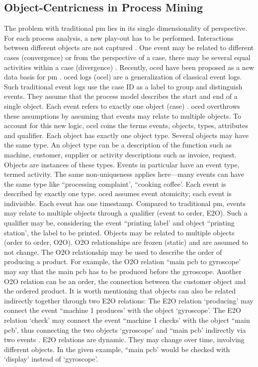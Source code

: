 \subsection{Object-Centricness in Process Mining}
\label{sec:object-centric-event-logs}

The problem with traditional \gls{pm} lies in its single dimensionality of perspective. For each process analysis, a new play-out has to be performed. Interactions between different objects are not captured \autocite{van2023object}. One event may be related to different cases (convergence) or from the perspective of a case, there may be several equal activities within a case (divergence) \autocite{van2019object}.
Recently, \gls{oced} have been proposed as a new data basis for \gls{pm} \autocite{van2019object}. \gls{oced} logs (\gls{ocel}) are a generalization of classical event logs. Such traditional event logs use the case ID as a label to group and distinguish events. They assume that the process model describes the start and end of a single object. Each event refers to exactly one object (case) \autocite{van2023object}. \gls{oced} overthrows these assumptions by assuming that events may relate to multiple objects. To account for this new logic, \gls{ocel} coins the terms events, objects, types, attributes and qualifier. Each object has exactly one object type. Several objects may have the same type. An object type can be a description of the function such as machine, customer, supplier or activity descriptions such as invoice, request. Objects are instances of these types. Events in particular have an event type, termed activity. The same non-uniqueness applies here—many events can have the same type like ``processing complaint', ``cooking coffee'. Each event is described by exactly one type. \gls{oced} assumes event atomicity; each event is indivisible. Each event has one timestamp. Compared to traditional \gls{pm}, events may relate to multiple objects through a qualifier (event to order, E2O). Such a qualifier may be, considering the event ``printing label' and object ``printing station', the label to be printed. Objects may be related to multiple objects (order to order, O2O). O2O relationships are frozen (static) and are assumed to not change. The O2O relationship may be used to describe the order of producing a product. For example, the O2O relation ``main pcb to gyroscope' may say that the main pcb has to be produced before the gyroscope. Another O2O relation can be an order, the connection between the customer object and the ordered product. It is worth mentioning that objects can also be related indirectly together through two E2O relations: The E2O relation `producing' may connect the event ``machine 1 produces' with the object `gyroscope'. The E2O relation `check' may connect the event ``machine 1 checks' with the object ``main pcb', thus connecting the two objects `gyroscope' and ``main pcb' indirectly via two events \autocite{van2019object}. E2O relations are dynamic. They may change over time, involving different objects. In the given example, ``main pcb' would be checked with `display' instead of `gyroscope'.

